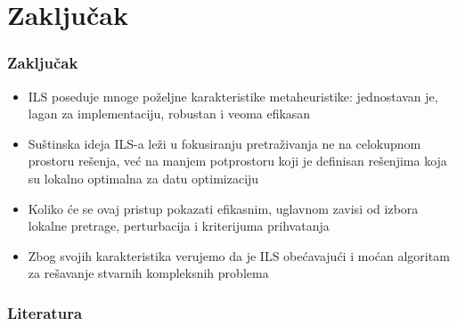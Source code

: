 \documentclass{beamer}
\begin{document}
\section{Zaključak}
\begin{frame}[fragile]\frametitle{Zaključak}
	\begin{itemize}
		\item ILS poseduje mnoge poželjne karakteristike metaheuristike: jednostavan je, lagan za implementaciju, robustan i veoma efikasan
		\item Suštinska ideja ILS-a leži u fokusiranju pretraživanja ne na celokupnom prostoru rešenja, već na manjem potprostoru koji je definisan rešenjima koja su lokalno optimalna za datu optimizaciju
		\item  Koliko će se ovaj pristup pokazati efikasnim, uglavnom zavisi od izbora lokalne pretrage, perturbacija i kriterijuma prihvatanja
		\item Zbog svojih karakteristika verujemo da je ILS obećavajući i moćan algoritam za rešavanje stvarnih kompleksnih problema
	\end{itemize}

\end{frame}

\begin{frame}[fragile]\frametitle{Literatura}
	\thispagestyle{empty}

\end{frame}
\end{document}
